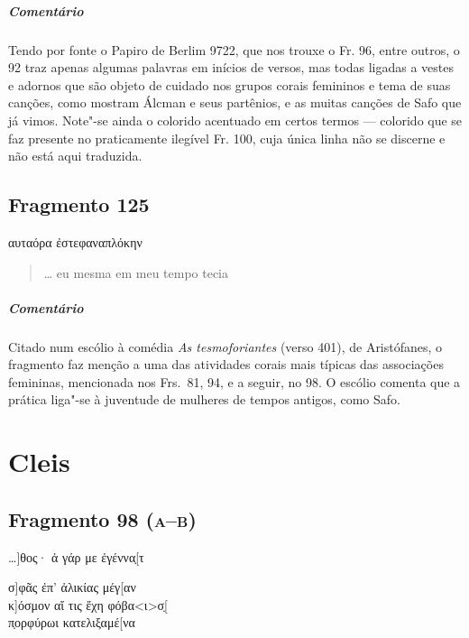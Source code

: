 {{\paragraph{Comentário} Tendo por fonte o Papiro de Berlim 9722, que nos trouxe o Fr. 96, entre outros, o 92 traz apenas algumas palavras em inícios de versos, mas todas ligadas a vestes e adornos que são objeto de cuidado nos grupos corais femininos e tema de suas canções, como mostram Álcman e seus partênios, e as muitas canções de Safo que já vimos. Note"-se ainda o colorido acentuado em certos termos --- colorido que se faz presente no praticamente ilegível Fr. 100, cuja única linha não se discerne e não está aqui traduzida.}



\pagebreak
\section{Fragmento 125}

\begin{gkverse}
\dagger{}αυταόρα\dagger{} ἐστεφαναπλόκην
\end{gkverse}

\begin{verse}
\ldots{} eu mesma em meu tempo tecia 
\end{verse}

{\paragraph{Comentário} Citado num escólio à comédia \textit{As tesmoforiantes} (verso 401), de Aristófanes, o fragmento faz menção a uma das atividades corais mais típicas das associações femininas, mencionada nos Frs.~81, 94, e a seguir, no 98. O escólio comenta que a prática liga"-se à juventude de mulheres de tempos antigos, como Safo.}



\chapter{Cleis}

\section{Fragmento 98 (\textsc{a--b})}

\begin{gkverse}
\ldots{}]θος· ἀ γάρ με ἐγέννα̣[τ

σ]φᾶς ἐπ’ ἀλικίας μέγ[αν\\
κ]όσμον αἴ τις ἔχη φόβα<ι>σ̣[\\
π̣ορφύρωι κατελιξαμέ[να


\end{gkverse}}
